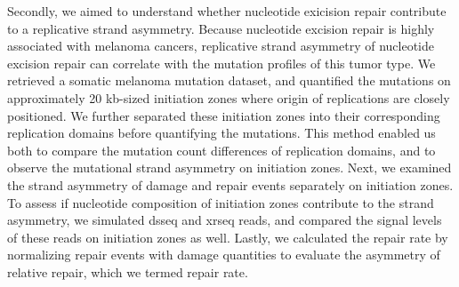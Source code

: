 Secondly, we aimed to understand whether nucleotide exicision repair contribute to a replicative strand asymmetry. Because nucleotide excision repair is highly associated with melanoma cancers, replicative strand asymmetry of nucleotide excision repair can correlate with the mutation profiles of this tumor type. We retrieved a somatic melanoma mutation dataset, and quantified the mutations on approximately 20 \gls{kb}-sized initiation zones where origin of replications are closely positioned. We further separated these initiation zones into their corresponding replication domains before quantifying the mutations. This method enabled us both to compare the mutation count differences of replication domains, and to observe the mutational strand asymmetry on initiation zones. Next, we examined the strand asymmetry of damage and repair events separately on initiation zones. To assess if nucleotide composition of initiation zones contribute to the strand asymmetry, we simulated \gls{dsseq} and \gls{xrseq} reads, and compared the signal levels of these reads on initiation zones as well. Lastly, we calculated the repair rate by normalizing repair events with damage quantities to evaluate the asymmetry of relative repair, which we termed repair rate.